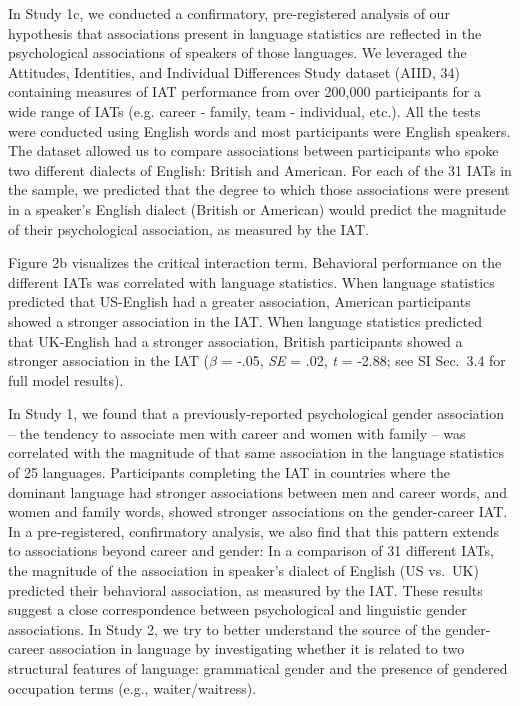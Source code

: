\documentclass[9pt,twocolumn]{pnas-new}
\begin{document}
In Study 1c, we conducted a confirmatory, pre-registered analysis of our hypothesis that associations present in language statistics are reflected in the psychological associations of speakers of those languages. We leveraged the Attitudes, Identities, and Individual Differences Study dataset (AIID, 34) containing measures of IAT performance from over 200,000 participants for a wide range of IATs (e.g. career - family, team - individual, etc.). All the tests were conducted using English words and most participants were English speakers. The dataset allowed us to compare associations between participants who spoke two different dialects of English: British and American. For each of the 31 IATs in the sample, we predicted that the degree to which those associations were present in a speaker’s English dialect (British or American) would predict the magnitude of their psychological association, as measured by the IAT.

Figure 2b visualizes the critical interaction term. Behavioral performance on the different IATs was correlated with language statistics. When language statistics predicted that US-English had a greater association, American participants showed a stronger association in the IAT. When language statistics predicted that UK-English had a stronger association, British participants showed a stronger association in the IAT (\(\beta\) = -.05, \emph{SE} = .02, \emph{t} = -2.88; see SI Sec.\ 3.4 for full model results).

In Study 1, we found that a previously-reported psychological gender association – the tendency to associate men with career and women with family – was correlated with the magnitude of that same association in the language statistics of 25 languages. Participants completing the IAT in countries where the dominant language had stronger associations between men and career words, and women and family words, showed stronger associations on the gender-career IAT. In a pre-registered, confirmatory analysis, we also find that this pattern extends to associations beyond career and gender: In a comparison of 31 different IATs, the magnitude of the association in speaker’s dialect of English (US vs.\ UK) predicted their behavioral association, as measured by the IAT. These results suggest a close correspondence between psychological and linguistic gender associations. In Study 2, we try to
better understand the source of the gender-career association in language by investigating whether it is related to two structural features of
language: grammatical gender and the presence of gendered occupation
terms (e.g., waiter/waitress). 
\end{document}
